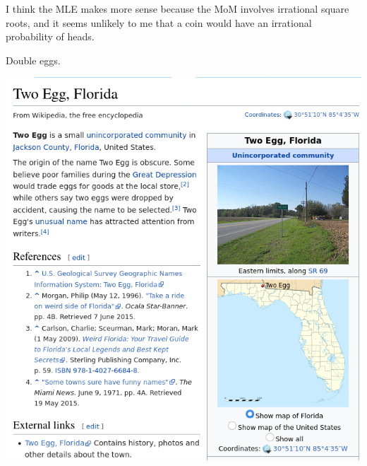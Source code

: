 \documentclass[12pt]{article}
\begin{document}
\medskip
{} I think the MLE makes more sense because the MoM involves irrational square roots, and it seems unlikely to me that a coin would have an irrational probability of heads.

\newpage
{} Double eggs.
\begin{center}\includegraphics{two-egg.png}\end{center}
\end{document}
